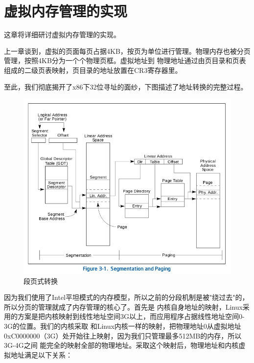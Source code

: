 
\section {虚拟内存管理的实现}

\par 这章将详细研讨虚拟内存管理的实现。

\par 上一章谈到，虚拟的页面每页占据4KB，按页为单位进行管理。物理内存也被分页管理，按照4KB分为一个个物理页框。虚拟地址到\allowbreak
物理地址通过由页目录和页表组成的二级页表映射，页目录的地址放置在CR3寄存器里。

\par 至此，我们彻底揭开了x86下32位寻址的面纱，下图描述了地址转换的完整过程。

\begin{figure}[ht]
      \centering
      \includegraphics[scale=0.6]{picture/chapt10/ADDR_TRAN.png}
      \caption{段页式转换}
\end{figure}

\par 因为我们使用了Intel平坦模式的内存模型，所以之前的分段机制是被"绕过去"的，所以分页的管理就成了内存管理的核心了。首先是\allowbreak
内核自身地址的映射，Linux采用的方案是把内核映射到线性地址空间3G以上，而应用程序占据线性地址空间0-3G的位置。我们的内核采取\allowbreak
和Linux内核一样的映射，把物理地址0从虚拟地址0xC0000000（3G）处开始往上映射，因为我们只管理最多512MB的内存，所以3G-4G之间\allowbreak
能完全的映射全部的物理地址。采取这个映射后，物理地址和内核虚拟地址满足以下关系：

